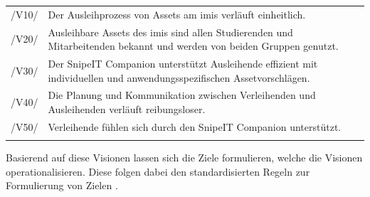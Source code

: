 \begin{center}
        \renewcommand{\arraystretch}{1.5}
        \begin{longtable}{lp{}} \arrayrulecolor{maincolor}\hline
                \sffamily\color{maincolor}/V10/ & Der Ausleihprozess von Assets am \ac{imis}
                verläuft einheitlich.\\
                \sffamily\color{maincolor}/V20/ & Ausleihbare Assets des \ac{imis} sind allen
                Studierenden und Mitarbeitenden bekannt und werden von beiden Gruppen genutzt.\\
                \sffamily\color{maincolor}/V30/ & Der SnipeIT Companion unterstützt Ausleihende
                effizient mit individuellen und anwendungsspezifischen Assetvorschlägen.\\
                \sffamily\color{maincolor}/V40/ & Die Planung und Kommunikation zwischen
                Verleihenden und Ausleihenden verläuft reibungsloser.\\
                \sffamily\color{maincolor}/V50/ & Verleihende fühlen sich durch den SnipeIT
                Companion unterstützt.\\
                \arrayrulecolor{maincolor}\hline
        \end{longtable}
\end{center}
\vspace*{-1.5cm}

Basierend auf diese Visionen lassen sich die Ziele formulieren, welche die Visionen
operationalisieren. Diese folgen dabei den standardisierten Regeln zur Formulierung von Zielen
\cite{pohl_requirements_2008}.

